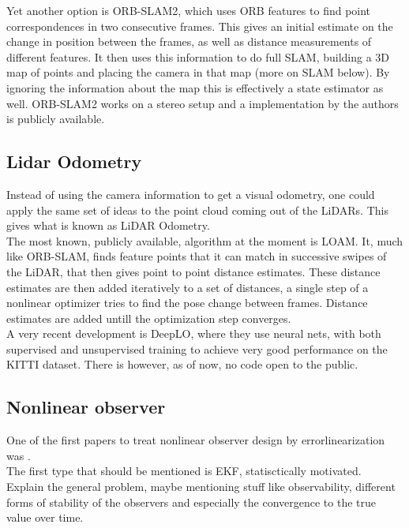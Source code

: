 Yet another option is ORB-SLAM2\cite{ORBSLAM}, which uses ORB features\cite{ORB} to find point correspondences in two consecutive frames. This gives an initial estimate on the change in position between the frames, as well as distance measurements of different features. It then uses this information to do full SLAM, building a 3D map of points and placing the camera in that map (more on SLAM below). By ignoring the information about the map this is effectively a state estimator as well. ORB-SLAM2 works on a stereo setup and a implementation by the authors is publicly available.

\subsection{Lidar Odometry}

Instead of using the camera information to get a visual odometry, one could apply the same set of ideas to the point cloud coming out of the LiDARs. This gives what is known as LiDAR Odometry. \\ 

The most known, publicly available, algorithm at the moment is LOAM\cite{LOAM}. It, much like ORB-SLAM, finds feature points that it can match in successive swipes of the LiDAR, that then gives point to point distance estimates. These distance estimates are then added iteratively to a set of distances, a single step of a nonlinear optimizer tries to find the pose change between frames. Distance estimates are added untill the optimization step converges. \\

A very recent development is DeepLO\cite{DeepLO}, where they use neural nets, with both supervised and unsupervised training to achieve very good performance on the KITTI dataset. There is however, as of now, no code open to the public.

\subsection{Nonlinear observer}
\iffalse
One of the first papers to treat nonlinear observer design by errorlinearization was \cite{FirstErrorLinNonlinObs}. \\

The first type that should be mentioned is EKF, statisctically motivated. \\ 

Explain the general problem, maybe mentioning stuff like observability, different forms of stability of the observers and especially the convergence to the true value over time. \\

